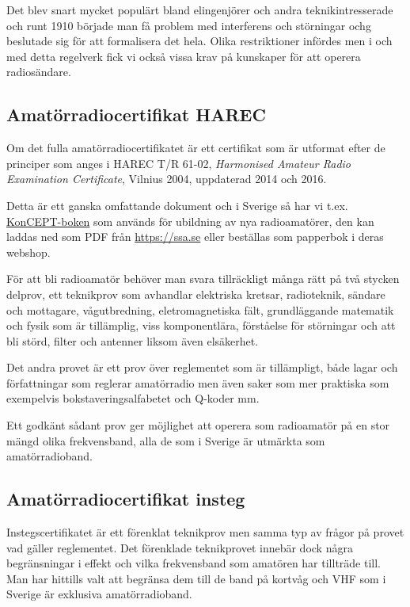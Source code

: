 Det blev snart mycket populärt bland elingenjörer och andra teknikintresserade
och runt 1910 började man få problem med interferens och störningar ochg
beslutade sig för att formalisera det hela. Olika restriktioner infördes men i
och med detta regelverk fick vi också vissa krav på kunskaper för att operera
radiosändare.

\subsection{Amatörradiocertifikat HAREC}

Om det fulla amatörradiocertifikatet är ett certifikat som är utformat efter
de principer som anges i HAREC T/R 61-02, {\it Harmonised Amateur Radio
  Examination Certificate}, Vilnius 2004, uppdaterad 2014 och 2016.

Detta är ett ganska omfattande dokument och i Sverige så har vi t.ex.
\href{https://github.com/SverigesSandareamatorer/SSA-Akademin}{KonCEPT-boken}
som används för ubildning av nya radioamatörer, den kan laddas ned som PDF
från \url{https://ssa.se} eller beställas som papperbok i deras webshop.

För att bli radioamatör behöver man svara tillräckligt många rätt på två
stycken delprov, ett teknikprov som avhandlar elektriska kretsar, radioteknik,
sändare och mottagare, vågutbredning, eletromagnetiska fält, grundläggande
matematik och fysik som är tillämplig, viss komponentlära, förståelse för
störningar och att bli störd, filter och antenner liksom även elsäkerhet.

Det andra provet är ett prov över reglementet som är tillämpligt, både lagar
och författningar som reglerar amatörradio men även saker som mer praktiska
som exempelvis bokstaveringsalfabetet och Q-koder mm.

Ett godkänt sådant prov ger möjlighet att operera som radioamatör på en stor
mängd olika frekvensband, alla de som i Sverige är utmärkta som
amatörradioband.

\subsection{Amatörradiocertifikat insteg}
\label{sec:instegscertifikat}

Instegscertifikatet är ett förenklat teknikprov men samma typ av frågor på
provet vad gäller reglementet. Det förenklade teknikprovet innebär dock några
begränsningar i effekt och vilka frekvensband som amatören har tillträde till.
Man har hittills valt att begränsa dem till de band på kortvåg och VHF som i
Sverige är exklusiva amatörradioband.

